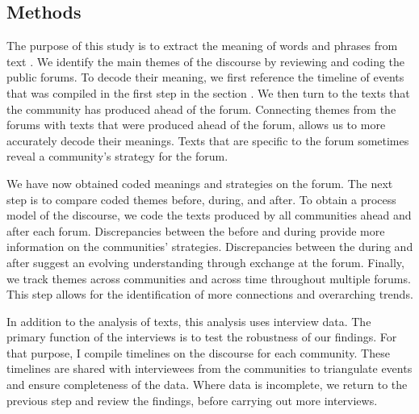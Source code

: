 
\subsection*{Methods}

The purpose of this study is to extract the meaning of words and phrases from text \citep{Parker1992}. We identify the main themes of the discourse by reviewing and coding the public forums. To decode their meaning, we first reference the timeline of events that was compiled in the first step in the section  \citep{Maguire2009}. We then turn to the texts that the community has produced ahead of the forum. Connecting themes from the forums with texts that were produced ahead of the forum, allows us to more accurately decode their meanings. Texts that are specific to the forum sometimes reveal a community's strategy for the forum.

We have now obtained coded meanings and strategies on the forum. The next step is to compare coded themes before, during, and after. To obtain a process model of the discourse, we code the texts produced by all communities ahead and after each forum. Discrepancies between the before and during provide more information on the communities' strategies. Discrepancies between the during and after suggest an evolving understanding through exchange at the forum. Finally, we track themes across communities and across time throughout multiple forums. This step allows for the identification of more connections and overarching trends.

In addition to the analysis of texts, this analysis uses interview data. The primary function of the interviews is to test the robustness of our findings. For that purpose, I compile timelines on the discourse for each community. These timelines are shared with interviewees from the communities to triangulate events and ensure completeness of the data. Where data is incomplete, we return to the previous step and review the findings, before carrying out more interviews.
